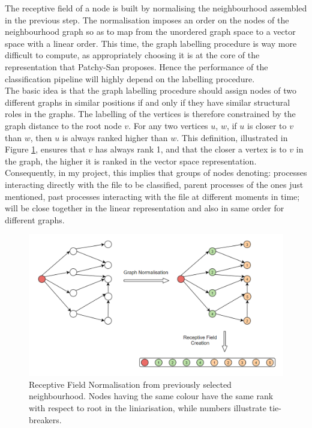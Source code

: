 The receptive field of a node is built by normalising the neighbourhood assembled in the previous step. The normalisation imposes an order on the nodes of the neighbourhood graph so as to map from the unordered graph space to a vector space with a linear order. This time, the graph labelling procedure is way more difficult to compute, as appropriately choosing it is at the core of the representation that Patchy-San proposes. Hence the performance of the classification pipeline will highly depend on the labelling procedure. \\

The basic idea is that the graph labelling procedure should assign nodes of two different graphs in similar positions if and only if they have similar structural roles in the graphs. The labelling of the vertices is therefore constrained by the graph distance to the root node $v$. For any two vertices $u$, $w$, if $u$ is closer to $v$ than $w$, then $u$ is
always ranked higher than $w$. This definition, illustrated in Figure \ref{normalisation}, ensures that $v$ has always rank 1, and that the closer a vertex is to $v$ in the graph, the higher it is ranked in the vector space representation. Consequently, in my project, this implies that groups of nodes denoting: processes interacting directly with the file to be classified, parent processes of the ones just mentioned, past processes interacting with the file at different moments in time; will be close together in the linear representation and also in same order for different graphs.

\begin{figure}[H]
  \centering
  \includegraphics[scale=0.45]{Images/normalisation.png}
  \caption{Receptive Field Normalisation from previously selected neighbourhood. Nodes having the same colour have the same rank with respect to root in the liniarisation, while numbers illustrate tie-breakers.}
  \label{normalisation}
\end{figure}

